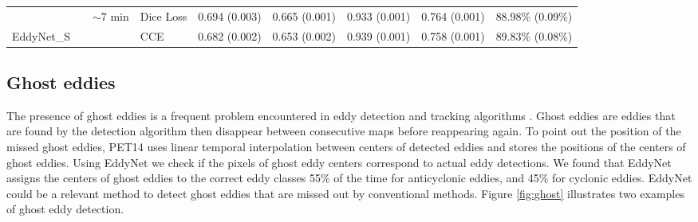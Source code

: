 \documentclass[journal]{IEEEtran}
\begin{document}
\begin{table*}[t]
\begin{tabular}{llll|l|l|l|ll}
\multicolumn{1}{|l|}{}                                  & \multicolumn{1}{l|}{}                   & \multicolumn{1}{l|}{$\sim$7 min}                   & \cellcolor[HTML]{FFCE93}Dice Loss      & \cellcolor[HTML]{FFCE93}0.694 (0.003) & \cellcolor[HTML]{FFCE93}0.665 (0.001) & \cellcolor[HTML]{FFCE93}0.933 (0.001) & \multicolumn{1}{l|}{\cellcolor[HTML]{FFCE93}0.764 (0.001)} & \multicolumn{1}{l|}{\cellcolor[HTML]{FFCE93}88.98\% (0.09\%)} \\ \cline{4-9} 
\multicolumn{1}{|l|}{\multirow{-2}{*}{EddyNet\_S}}    & \multicolumn{1}{l|}{\multirow{-4}{*}{}} & \multicolumn{1}{l|}{\multirow{-2}{*}{}} & \cellcolor[HTML]{FFFFC7}CCE & \cellcolor[HTML]{FFFFC7}0.682 (0.002) & \cellcolor[HTML]{FFFFC7}0.653 (0.002) & \cellcolor[HTML]{FFFFC7}0.939 (0.001) & \multicolumn{1}{l|}{\cellcolor[HTML]{FFFFC7}0.758 (0.001)} & \multicolumn{1}{l|}{\cellcolor[HTML]{FFFFC7}89.83\% (0.08\%)} \\ \hline
\end{tabular}
\end{table*}

\subsection{Ghost eddies}
The presence of ghost eddies is a frequent problem encountered in eddy detection and tracking algorithms \cite{faghmous2015daily}. Ghost eddies are eddies that are found by the detection algorithm then disappear between consecutive maps before reappearing again. To point out the position of the missed ghost eddies, PET14 uses linear temporal interpolation between centers of detected eddies and stores the positions of the centers of ghost eddies. Using EddyNet we check if the pixels of ghost eddy centers correspond to actual eddy detections. We found that EddyNet assigns the centers of ghost eddies to the correct eddy classes 55\% of the time for anticyclonic eddies, and 45\% for cyclonic eddies. EddyNet could be a relevant method to detect ghost eddies that are missed out by conventional methods. Figure \ref{fig:ghost} illustrates two examples of ghost eddy detection. 
\end{document}
